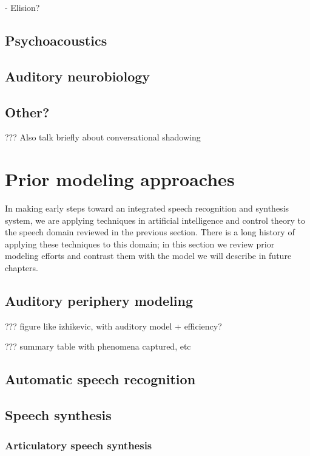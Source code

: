 - Elision?

\subsection{Psychoacoustics}

\subsection{Auditory neurobiology}

\subsection{Other?}

??? Also talk briefly about conversational shadowing

\section{Prior modeling approaches}

In making early steps toward
an integrated speech recognition and synthesis system,
we are applying techniques
in artificial intelligence and control theory
to the speech domain reviewed in the previous section.
There is a long history of applying these techniques
to this domain;
in this section we review prior modeling efforts
and contrast them with the model we will describe
in future chapters.

\subsection{Auditory periphery modeling}

??? figure like izhikevic, with auditory model + efficiency?

??? summary table with phenomena captured, etc

\subsection{Automatic speech recognition}

\subsection{Speech synthesis}

\subsubsection{Articulatory speech synthesis}

